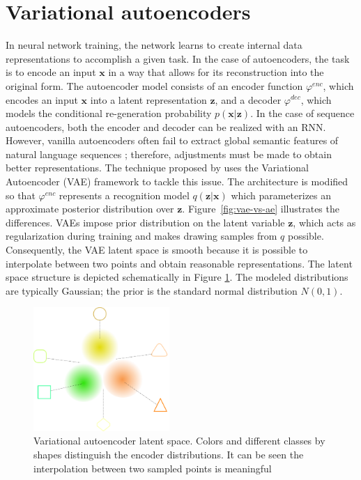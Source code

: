 \section{Variational autoencoders}
\label{02:sec:vae}
In neural network training, the network learns to create internal data representations to accomplish a given task.
In the case of autoencoders, the task is to encode an input $\mathbf{x}$ in a way that allows for its reconstruction into the original form.
The autoencoder model consists of an encoder function $\varphi^{enc}$, which encodes an input $\mathbf{x}$ into a latent representation $\mathbf{z}$, and a decoder $\varphi^{dec}$, which models the conditional re-generation probability $p(\mathbf{x}|\mathbf{z})$.
In the case of sequence autoencoders, both the encoder and decoder can be realized with an RNN.
However, vanilla autoencoders often fail to extract global semantic features of natural language sequences \cite{bowman2015generating}; therefore, adjustments must be made to obtain better representations.
The technique proposed by \citet{kingma2013auto} uses the Variational Autoencoder (VAE) framework to tackle this issue.
The architecture is modified so that $\varphi^{enc}$ represents a recognition model $q(\mathbf{z}|\mathbf{x})$ which parameterizes an approximate posterior distribution over $\mathbf{z}$.
Figure~\ref{fig:vae-vs-ae} illustrates the differences.
VAEs impose prior distribution on the latent variable $\mathbf{z}$, which acts as regularization during training and makes drawing samples from $q$ possible.
Consequently, the VAE latent space is smooth because it is possible to interpolate between two points and obtain reasonable representations.
The latent space structure is depicted schematically in Figure \ref{fig:vae}.
The modeled distributions are typically Gaussian; the prior is the standard normal distribution $N(0, 1)$.
\begin{figure}[t]
    \centering
    \includegraphics[width=0.46\textwidth]{images/VAE.png}
    \caption{Variational autoencoder latent space. Colors and different classes by shapes distinguish the encoder distributions. It can be seen the interpolation between two sampled points is meaningful}
    \label{fig:vae}
\end{figure}
